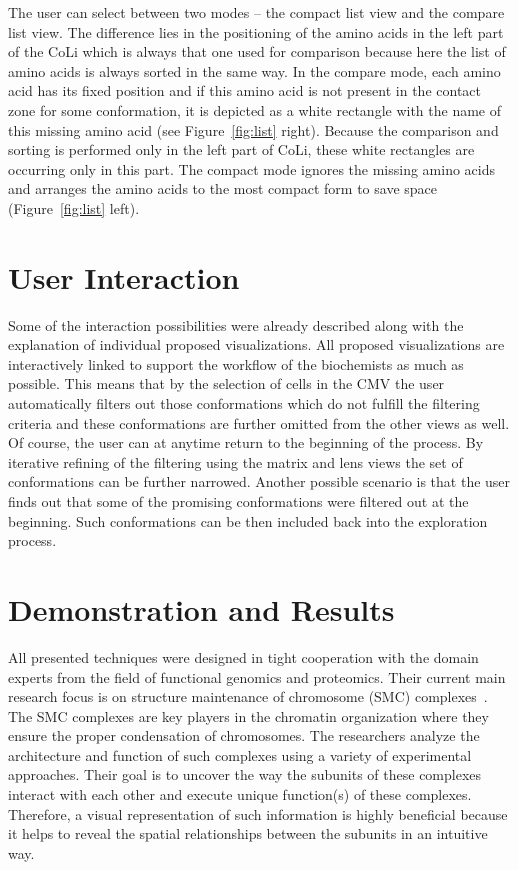\documentclass[journal]{vgtc}                %
\begin{document}
The user can select between two modes -- the compact list view and the compare list view.
The difference lies in the positioning of the amino acids in the left part of the CoLi which is always that one used for comparison because here the list of amino acids is always sorted in the same way. 
In the compare mode, each amino acid has its fixed position and if this amino acid is not present in the contact zone for some conformation, it is depicted as a white rectangle with the name of this missing amino acid (see Figure~\ref{fig:list} right).
Because the comparison and sorting is performed only in the left part of CoLi, these white rectangles are occurring only in this part.
The compact mode ignores the missing amino acids and arranges the amino acids to the most compact form to save space (Figure~\ref{fig:list} left).


\section{User Interaction}
Some of the interaction possibilities were already described along with the explanation of individual proposed visualizations.
All proposed visualizations are interactively linked to support the workflow of the biochemists as much as possible.
This means that by the selection of cells in the CMV the user automatically filters out those conformations which do not fulfill the filtering criteria and these conformations are further omitted from the other views as well.
Of course, the user can at anytime return to the beginning of the process. 
By iterative refining of the filtering using the matrix and lens views the set of conformations can be further narrowed.
Another possible scenario is that the user finds out that some of the promising conformations were filtered out at the beginning.
Such conformations can be then included back into the exploration process.

\section{Demonstration and Results}
All presented techniques were designed in tight cooperation with the domain experts from the field of functional genomics and proteomics.
Their current main research focus is on structure maintenance of chromosome (SMC) complexes~\cite{Hudson2011,Guerineau2012,Palecek2015}. 
The SMC complexes are key players in the chromatin organization where they ensure the proper condensation of chromosomes. 
The researchers analyze the architecture and function of such complexes using a variety of experimental approaches. 
Their goal is to uncover the way the subunits of these complexes interact with each other and execute unique function(s) of these complexes. 
Therefore, a visual representation of such information is highly beneficial because it helps to reveal the spatial relationships between the subunits in an intuitive way.
\end{document}
